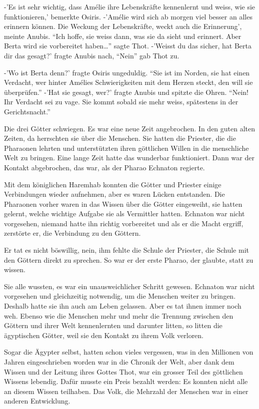 \documentclass[11pt,titlepage,a5paper]{book}
\begin{document}
-'Es ist sehr wichtig, dass Amélie ihre Lebenskräfte kennenlernt und weiss, wie sie funktionieren,' bemerkte Osiris. -'Amélie wird sich ab morgen viel besser an alles erinnern können. Die Weckung der Lebenskräfte, weckt auch die Erinnerung', meinte Anubis. "`Ich hoffe, sie weiss dann, was sie da sieht und erinnert. Aber Berta wird sie vorbereitet haben\dots"' sagte Thot. -'Weisst du das sicher, hat Berta dir das gesagt?' fragte Anubis nach, "`Nein"' gab Thot zu. 

-'Wo ist Berta denn?' fragte Osiris ungeduldig. "`Sie ist im Norden, sie hat einen Verdacht, wer hinter Amélies Schwierigkeiten mit dem Herzen steckt, den will sie überprüfen."' -'Hat sie gesagt, wer?' fragte Anubis und spitzte die Ohren. "`Nein! Ihr Verdacht sei zu vage. Sie kommt sobald sie mehr weiss, spätestens in der Gerichtsnacht."'

Die drei Götter schwiegen. Es war eine neue Zeit angebrochen. In den guten alten Zeiten, da herrschten sie über die Menschen. Sie hatten die Priester, die die Pharaonen lehrten und unterstützten ihren göttlichen Willen in die menschliche Welt zu bringen. Eine lange Zeit hatte das wunderbar funktioniert. Dann war der Kontakt abgebrochen, das war, als der Pharao Echnaton regierte.

Mit dem königlichen Haremhab konnten die Götter und Priester einige Verbindungen wieder aufnehmen, aber es waren Lücken entstanden. Die Pharaonen vorher waren in das Wissen über die Götter eingeweiht, sie hatten gelernt, welche wichtige Aufgabe sie als Vermittler hatten. Echnaton war nicht vorgesehen, niemand hatte ihn richtig vorbereitet und als er die Macht ergriff, zerstörte er, die Verbindung zu den Göttern.

Er tat es nicht böswillig, nein, ihm fehlte die Schule der Priester, die Schule mit den Göttern direkt zu sprechen. So war er der erste Pharao, der glaubte, statt zu wissen. 

Sie alle wussten, es war ein unausweichlicher Schritt gewesen. Echnaton war nicht vorgesehen und gleichzeitig notwendig, um die Menschen weiter zu bringen. Deshalb hatte sie ihn auch am Leben gelassen. Aber es tat ihnen immer noch weh. Ebenso wie die Menschen mehr und mehr die Trennung zwischen den Göttern und ihrer Welt kennenlernten und darunter litten, so litten die ägyptischen Götter, weil sie den Kontakt zu ihrem Volk verloren.

Sogar die Ägypter selbst, hatten schon vieles vergessen, was in den Millionen von Jahren eingeschrieben worden war in die Chronik der Welt, aber dank dem Wissen und der Leitung ihres Gottes Thot, war ein grosser Teil des göttlichen Wissens lebendig. Dafür musste ein Preis bezahlt werden: Es konnten nicht alle an diesem Wissen teilhaben. Das Volk, die Mehrzahl der Menschen war in einer anderen Entwicklung.
\end{document}

